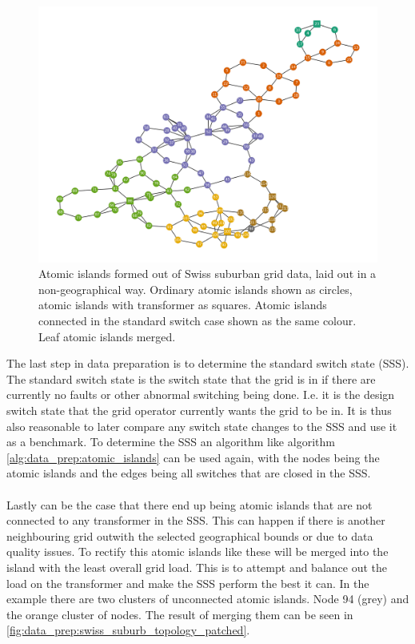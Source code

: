 \begin{figure}[H]
    \begin{center}
        \includegraphics[width=.8\linewidth]{img/switchstate_exploring/swiss_suburb/topology_sss.png}
    \end{center}
    \caption{
        Atomic islands formed out of Swiss suburban grid data, laid out in a non-geographical way.
        Ordinary atomic islands shown as circles, atomic islands with transformer as squares. Atomic islands connected in the
        standard switch case shown as the same colour. Leaf atomic islands merged.
    }
    \label{fig:data_prep:swiss_suburb_topology}
\end{figure}

The last step in data preparation is to determine the standard switch state (SSS). The standard switch
state is the switch state that the grid is in if there are currently no faults or other abnormal
switching being done. I.e. it is the design switch state that the grid operator currently wants the
grid to be in. It is thus also reasonable to later compare any switch state changes to
the SSS and use it as a benchmark. To determine the SSS
an algorithm like algorithm \ref{alg:data_prep:atomic_islands} can be used again, with the nodes being
the atomic islands and the edges being all switches that are closed in the SSS.\\
\\
Lastly can be the case that there end up being atomic islands that are not connected to any
transformer in the SSS. This can happen if there is another neighbouring grid outwith the selected
geographical bounds or due to data quality issues. To rectify this atomic islands like these will
be merged into the island with the least overall grid load. This is to attempt and balance out
the load on the transformer and make the SSS perform the best it can. In the example
there are two clusters of unconnected atomic islands.
Node 94 (grey) and the orange cluster of nodes.
The result of merging them can be seen in \autoref{fig:data_prep:swiss_suburb_topology_patched}.

